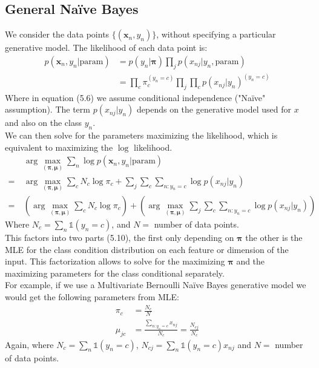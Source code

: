 \documentclass{article}
\renewcommand{\v}{\boldsymbol}
\begin{document}
\subsection{General Na\"ive Bayes}
    We consider the data points $\{(\v x_n,y_n)\}$, without specifying a particular generative model. The likelihood of each data point is:
    \begin{align}
        p(\v x_n,y_n | \text{param}) &= p(y_n|\v \pi)\prod_j p(x_{nj}|y_n, \text{param})\\
        &= \prod_c \pi_c^{(y_n = c)} \prod_j \prod_c p(x_{nj}|y_n)^{(y_n=c)}
    \end{align}
    Where in equation (5.6) we assume conditional independence ("Na\"ive" assumption). The term $p(x_{nj}|y_n)$ depends on the generative model used for $x$ and also on the class $y_n$.\\
    We can then solve for the parameters maximizing the likelihood, which is equivalent to maximizing the $\log$ likelihood.
    \begin{align}
    		&\arg\!\max_{(\v \pi,\v \mu)} \sum_n \log p(\v x_n , y_n| \text{param})\\
    		=~ & \arg\!\max_{(\v \pi,\v \mu)} \sum_c N_c \log \pi_c + \sum_j\sum_c\sum_{n:y_n=c}\log p(x_{nj}|y_n)\\
    	    =~ & \left(\arg\!\max_{(\v \pi,\v \mu)} \sum_c N_c \log \pi_c\right) + \left(\arg\!\max_{(\v \pi,\v \mu)} \sum_j\sum_c\sum_{n:y_n=c}\log p(x_{nj}|y_n)\right)
    \end{align}
    Where $N_c = \sum_n \mathbb{1}(y_n = c)$, and $N =$ number of data points.\\
    This factors into two parts (5.10), the first only depending on $\v\pi$ the other is the MLE for the class condition distribution on each feature or dimension of the input. This factorization allows to solve for the maximizing $\v\pi$ and the maximizing parameters for the class conditional separately.\\
    For example, if we use a Multivariate Bernoulli Na\"ive Bayes generative model we would get the following parameters from MLE:
    \begin{align}
    		\pi_c &= \frac{N_c}{N}\\
    		\mu_{jc} &= \frac{\sum_{n:y_n=c}x_{nj}}{N_c} = \frac{N_{cj}}{N_c}
    \end{align}
    Again, where $N_c = \sum_n \mathbb{1}(y_n = c)$, $N_{cj} = \sum_n \mathbb{1}(y_n = c) x_{nj}$ and $N =$ number of data points.\\
\end{document}
